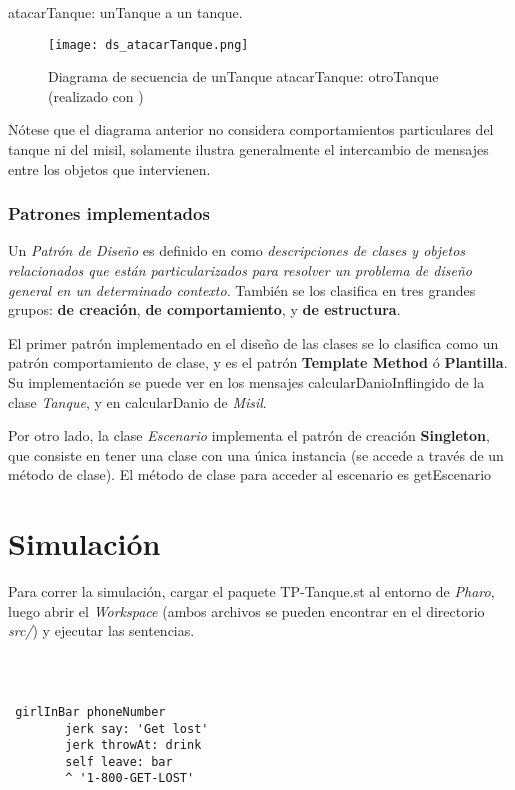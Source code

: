 {\ttfamily atacarTanque: unTanque} a un tanque. 

\begin{figure}[H]
    \centering
    \texttt{[image: ds\_atacarTanque.png]}
    \caption{Diagrama de secuencia de {\ttfamily unTanque atacarTanque: otroTanque} (realizado con \autocite{ds})}
\end{figure}

Nótese que el diagrama anterior no considera comportamientos particulares del tanque ni del misil, solamente ilustra generalmente el intercambio de mensajes entre los objetos que intervienen.




\subsubsection{Patrones implementados}

Un \emph{Patrón de Diseño} es definido en \autocite{gof} como \emph{descripciones de clases y objetos relacionados que están particularizados para resolver un problema de diseño general en un determinado contexto}. También se los clasifica en tres grandes grupos: \textbf{de creación}, \textbf{de comportamiento}, y \textbf{de estructura}.    

El primer patrón implementado en el diseño de las clases se lo clasifica como un patrón comportamiento de clase, y es el patrón \textbf{Template Method} ó \textbf{Plantilla}. Su implementación se puede ver en los mensajes {\ttfamily calcularDanioInflingido} de la clase \emph{Tanque}, y en {\ttfamily calcularDanio} de \emph{Misil}.

Por otro lado, la clase \emph{Escenario} implementa el patrón de creación \textbf{Singleton}, que consiste en tener una clase con una única instancia (se accede a través de un método de clase). El método de clase para acceder al escenario es {\ttfamily getEscenario}

\section{Simulación}

Para correr la simulación, cargar el paquete {\ttfamily TP-Tanque.st} al entorno de \emph{Pharo}, luego abrir el \emph{Workspace} (ambos archivos se pueden encontrar en el directorio \emph{src/}) y ejecutar las sentencias.  




\clearpage
\printbibliography



\subsection{}
\emph{} 

~\\

\begin{lstlisting}
 girlInBar phoneNumber 
        jerk say: 'Get lost'
        jerk throwAt: drink
        self leave: bar
        ^ '1-800-GET-LOST'
\end{lstlisting}
